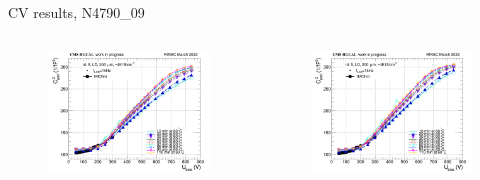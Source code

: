 \documentclass{beamer}
\begin{document}
\begin{frame}{CV results, N4790\_09}
  \begin{columns}
    \begin{figure}
        \includegraphics[width=1.0\textwidth]{plots/8in_198ch_2019_N4790_21_4E15_neg40degC_annealing_CV_ch101.png}    
    \end{figure}
    \begin{figure}
        \includegraphics[width=1.0\textwidth]{plots/8in_198ch_2019_N4790_21_4E15_neg40degC_annealing_CV_ch109.png}    
    \end{figure}
  \end{columns}
\end{frame}
\end{document}
